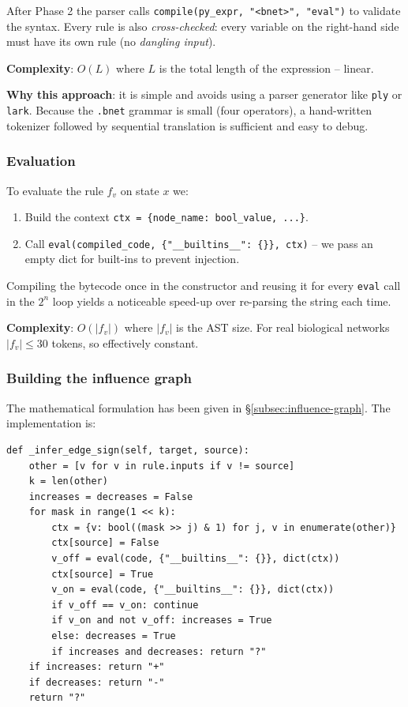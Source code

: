 \documentclass[oneside,final]{hcmut-report}
\begin{document}
After Phase 2 the parser calls \texttt{compile(py\_expr, "<bnet>", "eval")} to validate the syntax. Every rule is also \textit{cross-checked}: every variable on the right-hand side must have its own rule (no \textit{dangling input}).

\textbf{Complexity}: $O(L)$ where $L$ is the total length of the expression -- linear.

\textbf{Why this approach}: it is simple and avoids using a parser generator like \texttt{ply} or \texttt{lark}. Because the \texttt{.bnet} grammar is small (four operators), a hand-written tokenizer followed by sequential translation is sufficient and easy to debug.

\subsubsection{Evaluation}

To evaluate the rule $f_v$ on state $x$ we:
\begin{enumerate}[leftmargin=*]
    \item Build the context \texttt{ctx = \{node\_name: bool\_value, ...\}}.
    \item Call \texttt{eval(compiled\_code, \{"\_\_builtins\_\_": \{\}\}, ctx)} -- we pass an empty dict for built-ins to prevent injection.
\end{enumerate}

Compiling the bytecode once in the constructor and reusing it for every \texttt{eval} call in the $2^n$ loop yields a noticeable speed-up over re-parsing the string each time.

\textbf{Complexity}: $O(|f_v|)$ where $|f_v|$ is the AST size. For real biological networks $|f_v| \leq 30$ tokens, so effectively constant.

\subsubsection{Building the influence graph}

The mathematical formulation has been given in \S\ref{subsec:influence-graph}. The implementation is:

\begin{lstlisting}[caption={Edge-sign inference}, label={lst:edge-sign}]
def _infer_edge_sign(self, target, source):
    other = [v for v in rule.inputs if v != source]
    k = len(other)
    increases = decreases = False
    for mask in range(1 << k):
        ctx = {v: bool((mask >> j) & 1) for j, v in enumerate(other)}
        ctx[source] = False
        v_off = eval(code, {"__builtins__": {}}, dict(ctx))
        ctx[source] = True
        v_on = eval(code, {"__builtins__": {}}, dict(ctx))
        if v_off == v_on: continue
        if v_on and not v_off: increases = True
        else: decreases = True
        if increases and decreases: return "?"
    if increases: return "+"
    if decreases: return "-"
    return "?"
\end{lstlisting}
\end{document}
